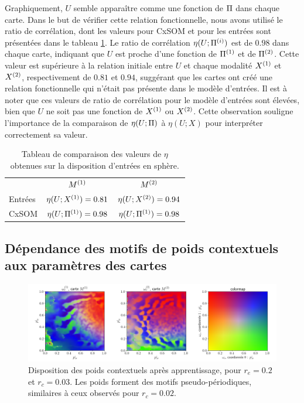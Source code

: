 \documentclass[../main]{subfiles}
\begin{document}
Graphiquement, $U$ semble apparaître comme une fonction de $\Pi$ dans chaque carte. Dans le but de vérifier cette relation fonctionnelle, nous avons utilisé le ratio de corrélation, dont les valeurs pour CxSOM et pour les entrées sont présentées dans le tableau \ref{tab:eta2D}. Le ratio de corrélation $\eta(U;\Pi^{({i})})$ est de $0.98$ dans chaque carte, indiquant que $U$ est proche d'une fonction de $\Pi^{({1})}$ et de $\Pi^{({2})}$. Cette valeur est supérieure à la relation initiale entre $U$ et chaque modalité $X^{({1})}$ et $X^{({2})}$, respectivement de $0.81$ et $0.94$, suggérant que les cartes ont créé une relation fonctionnelle qui n'était pas présente dans le modèle d'entrées.
Il est à noter que ces valeurs de ratio de corrélation pour le modèle d'entrées sont élevées, bien que $U$ ne soit pas une fonction de $X^{({1})}$ ou $X^{({2})}$. 
Cette observation souligne l'importance de la comparaison de $\eta(U;\Pi)$ à $\eta(U;X)$ pour interpréter correctement sa valeur.

\begin{table}
	\caption{Tableau de comparaison des valeurs de $\eta$ obtenues sur la disposition d'entrées en sphère. \label{tab:eta2D}}
	\centering\begin{tabular}{lcc}
						&$M^{({1})}$ 					& $M^{({2})}$ 						\\
		Entrées 		& $\eta(U;X^{({1})}) = 0.81$ & $\eta(U;X^{({2})}) = 0.94$  \\
		CxSOM  	 		& $\eta(U;\Pi^{({1})}) = 0.98$ & $\eta(U;\Pi^{({1})}) = 0.98$ 	\\
	\end{tabular}
\end{table}

\subsection{Dépendance des motifs de poids contextuels aux paramètres des cartes \label{par:params2D}}

\begin{figure}
	\includegraphics[width=\textwidth]{weights_contexte-0-048_rc003.png}
	\caption{Disposition des poids contextuels après apprentissage, pour $r_e = 0.2$ et $r_c = 0.03$. Les poids forment des motifs pseudo-périodiques, similaires à ceux observés pour $r_c = 0.02$. \label{fig:rc_003}}
\end{figure}
\end{document}

